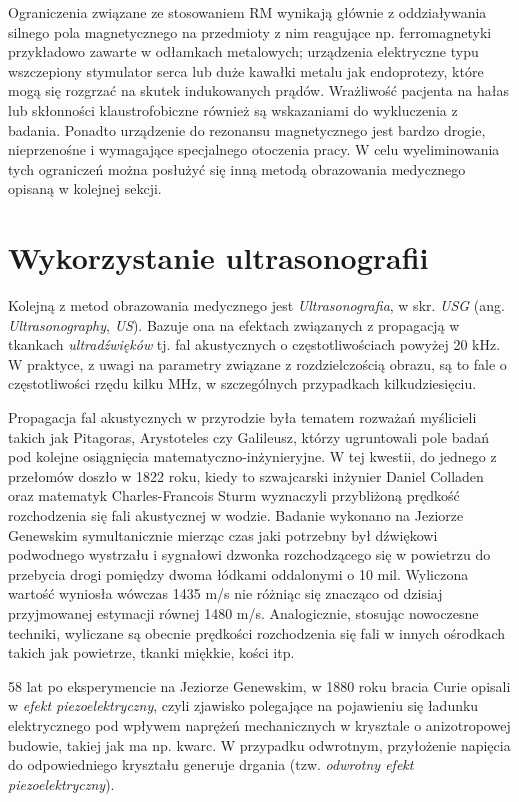 Ograniczenia związane ze stosowaniem RM wynikają głównie z oddziaływania silnego pola magnetycznego na przedmioty z nim reagujące np. ferromagnetyki przykładowo zawarte w odłamkach metalowych; urządzenia elektryczne typu wszczepiony stymulator serca lub duże kawałki metalu jak endoprotezy, które mogą się rozgrzać na skutek indukowanych prądów. Wrażliwość pacjenta na hałas lub skłonności klaustrofobiczne również są wskazaniami do wykluczenia z badania. Ponadto urządzenie do rezonansu magnetycznego jest bardzo drogie, nieprzenośne i wymagające specjalnego otoczenia pracy. W celu wyeliminowania tych ograniczeń można posłużyć się inną metodą obrazowania medycznego opisaną w kolejnej sekcji. 

\section{Wykorzystanie ultrasonografii}
\label{USG}

Kolejną z metod obrazowania medycznego jest \textit{Ultrasonografia}, w skr. \textit{USG} (ang. \textit{Ultrasonography}, \textit{US}). Bazuje ona na efektach związanych z propagacją w tkankach \textit{ultradźwięków} tj. fal akustycznych o częstotliwościach powyżej 20 kHz. W praktyce, z uwagi na parametry związane z rozdzielczością obrazu, są to fale o częstotliwości rzędu kilku MHz, w szczególnych przypadkach kilkudziesięciu.

Propagacja fal akustycznych w przyrodzie była tematem rozważań myślicieli takich jak Pitagoras, Arystoteles czy Galileusz, którzy ugruntowali pole badań pod kolejne osiągnięcia matematyczno-inżynieryjne. W tej kwestii, do jednego z przełomów doszło w 1822 roku, kiedy to szwajcarski inżynier Daniel Colladen oraz matematyk Charles-Francois Sturm wyznaczyli przybliżoną prędkość rozchodzenia się fali akustycznej w wodzie. Badanie wykonano na Jeziorze Genewskim symultanicznie mierząc czas jaki potrzebny był dźwiękowi podwodnego wystrzału i sygnałowi dzwonka rozchodzącego się w powietrzu do przebycia drogi pomiędzy dwoma łódkami oddalonymi o 10 mil. Wyliczona wartość wyniosła wówczas 1435 m/s nie różniąc się znacząco od dzisiaj przyjmowanej estymacji równej 1480 m/s. Analogicznie, stosując nowoczesne techniki, wyliczane są obecnie prędkości rozchodzenia się fali \linebreak w innych ośrodkach takich jak powietrze, tkanki miękkie, kości itp.

58 lat po eksperymencie na Jeziorze Genewskim, w 1880 roku bracia Curie opisali w \cite{Curie1880} \textit{efekt piezoelektryczny}, czyli zjawisko polegające na pojawieniu się ładunku elektrycznego pod wpływem naprężeń mechanicznych w krysztale o anizotropowej budowie, takiej jak ma np. kwarc. W przypadku odwrotnym, przyłożenie napięcia do odpowiedniego kryształu generuje drgania (tzw. \textit{odwrotny efekt piezoelektryczny}). 

